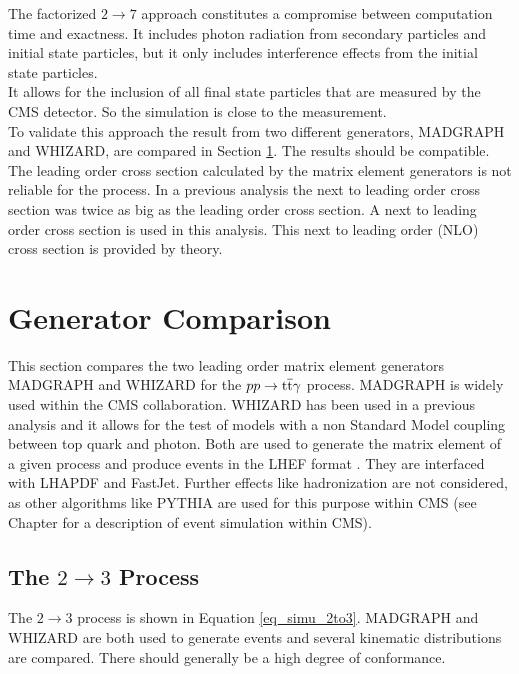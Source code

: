 The factorized $2 \to 7$ approach constitutes a compromise between computation time and exactness. It includes photon radiation from secondary particles and initial state particles, but it only includes interference effects from the initial state particles. \\
It allows for the inclusion of all final state particles that are measured by the CMS detector. So the simulation is close to the measurement.\\
To validate this approach the result from two different generators, MADGRAPH and WHIZARD, are compared in Section \ref{ch_simu_comp}. The results should be compatible. \\
The leading order cross section calculated by the matrix element generators is not reliable for the \ttgamma process. In a previous analysis the next to leading order cross section was twice as big as the leading order cross section. A next to leading order cross section is used in this analysis. This next to leading order (NLO) cross section is provided by theory. \\ 

\section{Generator Comparison}
\label{ch_simu_comp}

This section compares the two leading order matrix element generators MADGRAPH and WHIZARD for the $pp \to \mathrm{t}\overline{\mathrm{t}} \gamma$ process. MADGRAPH is widely used within the CMS collaboration. WHIZARD has been used in a previous \ttgamma analysis \cite{CMS-PAS-TOP-13-011} and it allows for the test of models with a non Standard Model coupling between top quark and photon. Both are used to generate the matrix element of a given process and produce events in the LHEF format \cite{Alwall:2006yp}. They are interfaced with LHAPDF \cite{Whalley:2005nh} and FastJet\cite{Cacciari:2011ma}. Further effects like hadronization are not considered, as other algorithms like PYTHIA  are used for this purpose within CMS (see Chapter  for a description of event simulation within CMS).

\subsection{The $2 \to 3$ Process}

The $2 \to 3$ process is shown in Equation \ref{eq_simu_2to3}. MADGRAPH and WHIZARD are both used to generate events and several kinematic distributions are compared. There should generally be a high degree of conformance.

